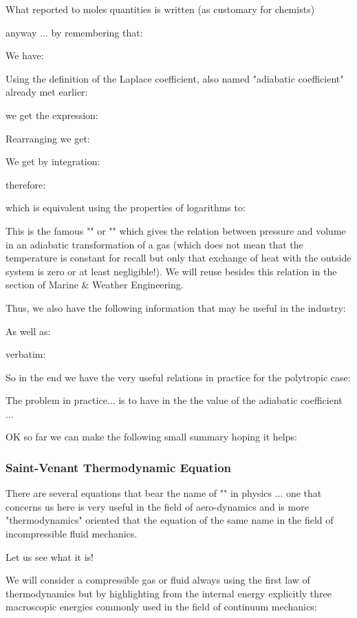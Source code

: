 	What reported to moles quantities is written (as customary for chemists)
	
	anyway ... by remembering that:
	
	We have:
	
	Using the definition of the Laplace coefficient, also named "adiabatic coefficient" already met earlier:
	
	we get the expression:
	
	Rearranging we get:
	
	We get by integration:
	
	therefore:
	
	which is equivalent using the properties of logarithms to:
	
	This is the famous "" or "" which gives the relation between pressure and volume in an adiabatic transformation of a gas (which does not mean that the temperature is constant for recall but only that exchange of heat with the outside system is zero or at least negligible!). We will reuse besides this relation in the section of Marine \& Weather Engineering.

	Thus, we also have the following information that may be useful in the industry:
	
	As well as:
	
	verbatim:
	
	So in the end we have the very useful relations in practice for the polytropic case:
	
	The problem in practice... is to have in the the value of the adiabatic coefficient ...
	
	OK so far we can make the following small summary hoping it helps:
	
	
	\subsubsection{Saint-Venant Thermodynamic Equation}
	There are several equations that bear the name of "" in physics ... one that concerns us here is very useful in the field of aero-dynamics and is more "thermodynamics" oriented that the equation of the same name in the field of incompressible fluid mechanics.

	Let us see what it is!
	
	We will consider a compressible gas or fluid always using the first law of thermodynamics but by highlighting from the internal energy explicitly three macroscopic energies commonly used in the field of continuum mechanics:
	
